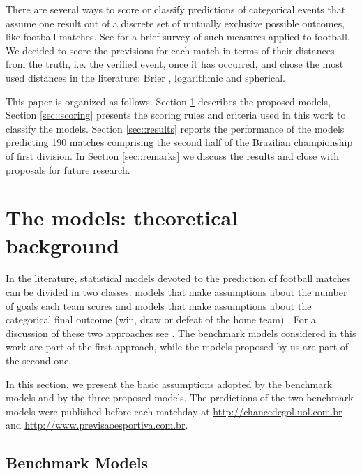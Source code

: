 \documentclass[journal,article,accept,moreauthors,pdftex,12pt,a4paper]{mdpi}
\begin{document}
	
	There are several ways to score or classify predictions of categorical events that assume one result out of a discrete set of mutually exclusive possible outcomes, like football matches.
	See \cite{constantinou} for a brief survey of such measures applied to football.
	We decided to score the previsions for each match in terms of their distances from the truth, i.e. the verified event, once it has occurred, and chose the most used distances in the literature: Brier \cite{brier1950}, logarithmic and spherical.
	
	This paper is organized as follows.
	Section \ref{sec::experimental} describes the proposed models, Section \ref{sec::scoring} presents the scoring rules and criteria used in this work to classify the models.
	Section \ref{sec::results} reports the performance of the models predicting 190 matches comprising the second half of the Brazilian championship of first division.
	In Section \ref{sec::remarks} we discuss the results and close with proposals for future research.
	
	
	
	\section{The models: theoretical background}
	\label{sec::experimental}
	
	In the literature, statistical models devoted to the prediction of
	football matches can be divided in two classes: models that make
	assumptions about the number of goals each team scores
	\citep{Maher82, Dixon97, Karlis2003} and models that make
	assumptions about the categorical final outcome (win, draw or defeat
	of the home team) \citep{Forrest2000, Koning2000, Brillinger2008,
		Brillinger2009}. For a discussion of these two approaches see
	\cite{Goddard2005}. The benchmark models considered in this work are
	part of the first approach, while the models proposed by us are part
	of the second one.
	
	In this section, we present the basic assumptions adopted by the benchmark models and 
	by the three proposed models. The predictions of the
	two benchmark models were published before each matchday at
	\url{http://chancedegol.uol.com.br} and
	\url{http://www.previsaoesportiva.com.br}.
	
	\subsection{Benchmark Models}
	\label{sec::Benchmark}
	
\end{document}
